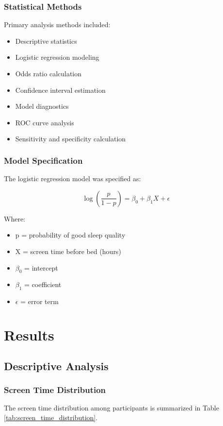 \documentclass[conference]{IEEEtran}
\begin{document}
\subsubsection{Statistical Methods}
Primary analysis methods included:
\begin{itemize}
\item Descriptive statistics
\item Logistic regression modeling
\item Odds ratio calculation
\item Confidence interval estimation
\item Model diagnostics
\item ROC curve analysis
\item Sensitivity and specificity calculation
\end{itemize}

\subsubsection{Model Specification}
The logistic regression model was specified as:

\begin{equation}
\log\left(\frac{p}{1-p}\right) = \beta_0 + \beta_1X + \epsilon
\end{equation}

Where:
\begin{itemize}
\item p = probability of good sleep quality
\item X = screen time before bed (hours)
\item $\beta_0$ = intercept
\item $\beta_1$ = coefficient
\item \(\epsilon\) = error term
\end{itemize}

\section{Results}
\subsection{Descriptive Analysis}
\subsubsection{Screen Time Distribution}
The screen time distribution among participants is summarized in Table \ref{tab:screen_time_distribution}.
\end{document}
